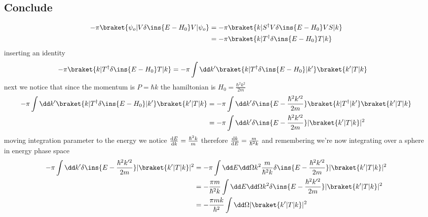 \subsection{Conclude}
\begin{align}
	- \pi\braket{\psi_o\vert V \delta\ins{E-H_0} V \vert \psi_o} &= - \pi\braket{k\vert S^\dagger V \delta\ins{E-H_0} VS \vert k} \\
	&= - \pi\braket{k\vert T^\dagger \delta\ins{E-H_0} T \vert k}
\end{align}
inserting an identity
\begin{align}
	- \pi\braket{k\vert T^\dagger \delta\ins{E-H_0} T \vert k} &= -\pi\int\dd k' \braket{k\vert T^\dagger \delta\ins{E-H_0}\vert k'}\braket{k' \vert T \vert k}
\end{align}
next we notice that since the momentum is \(P = \hbar k\) the hamiltonian is \(H_0 = \frac{\hbar^2 k^2}{2m}\)
\begin{align}
	-\pi\int\dd k' \braket{k\vert T^\dagger \delta\ins{E-H_0}\vert k'}\braket{k' \vert T \vert k} &= -\pi\int\dd k' \delta\ins{E-\frac{\hbar^2 k'^2}{2m}}\braket{k\vert T^\dagger \vert k'}\braket{k' \vert T \vert k}\\
	&= -\pi\int\dd k' \delta\ins{E-\frac{\hbar^2 k'^2}{2m}}\lvert\braket{k'\vert T \vert k}\rvert^2
\end{align}
moving integration parameter to the energy we notice \(\diff{E}{k} = \frac{\hbar^2 k}{m}\) therefore \(\diff{k}{E} = \frac{m}{\hbar^2 k}\) and remembering we're now integrating over a sphere in energy phase space
\begin{align}
	-\pi\int\dd k' \delta\ins{E-\frac{\hbar^2 k'^2}{2m}}\lvert\braket{k'\vert T \vert k}\rvert^2 &= -\pi\int\dd E \dd \Omega k^2 \frac{m}{\hbar^2 k} \delta\ins{E-\frac{\hbar^2 k'^2}{2m}}\lvert\braket{k'\vert T \vert k}\rvert^2 \\
	&= -\frac{\pi m}{\hbar^2 k}\int\dd E \dd \Omega k^2 \delta\ins{E-\frac{\hbar^2 k'^2}{2m}}\lvert\braket{k'\vert T \vert k}\rvert^2\\
	&= -\frac{\pi mk}{\hbar^2 }\int \dd \Omega \lvert\braket{k'\vert T \vert k}\rvert^2
\end{align}
